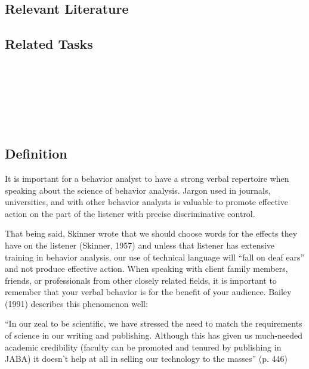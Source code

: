 \subsection{Relevant Literature}
\begin{refsection}
\nocite{bailey2013ethics,
        bac2014professional,
        cooper2007applied,
        van1988right}
\printbibliography[heading=none]
\end{refsection} 
%
\subsection{Related Tasks}
\fourbTwo{}\\
\fourgTwo{}\\
\fourgSix{}\\
\fourkEight{}\\
\fourkNine{}\\
%
\clearpage \section[\fourgFour{}]{\fourgFour{}%
              }
\subsection{Definition}
It is important for a behavior analyst to have a strong verbal repertoire when speaking about the science of behavior analysis. Jargon used in journals, universities, and with other behavior analysts is valuable to promote effective action on the part of the listener with precise discriminative control. 

That being said, Skinner wrote that we should choose words for the effects they have on the listener (Skinner, 1957) and unless that listener has extensive training in behavior analysis, our use of technical language will ``fall on deaf ears'' and not produce effective action. When speaking with client family members, friends, or professionals from other closely related fields, it is important to remember that your verbal behavior is for the benefit of your audience. Bailey (1991) describes this phenomenon well:

``In our zeal to be scientific, we have stressed the need to match the requirements of science in our writing and publishing. Although this has given us much-needed academic credibility (faculty can be promoted and tenured by publishing in JABA) it doesn't help at all in selling our technology to the masses'' (p. 446)

